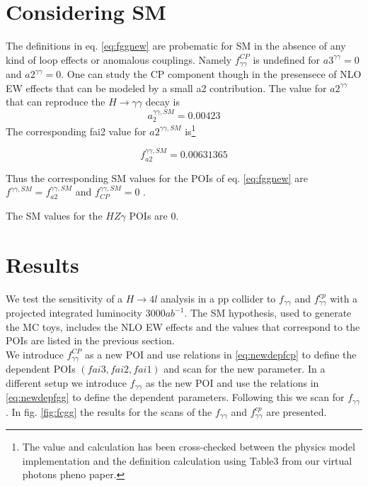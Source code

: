 \documentclass[10pt,a4paper]{article}
\begin{document}
\section{Considering SM}

The definitions in eq. \ref{eq:fggnew} are probematic for SM in the absence of any kind of loop effects or anomalous couplings. Namely $f_{\gamma\gamma}^{CP}$ is undefined for $a3^{\gamma\gamma} = 0$ and $a2^{\gamma\gamma} = 0$. One can study the CP component though in the presensece of NLO EW effects that can be modeled by a small a2 contribution. The value for $a2^{\gamma\gamma}$ that can reproduce the $H\rightarrow \gamma\gamma$ decay is
\begin{equation} 
a_{2}^{\gamma\gamma,SM} = 0.00423 
\end{equation}
The corresponding fai2 value for  $a2^{\gamma\gamma,SM}$ is\footnote{The value and calculation has been cross-checked between the physics model implementation and the definition calculation using Table3 from our virtual photons pheno paper.  } 
 
\begin{equation}
 f_{a2}^{\gamma\gamma,SM} = 0.00631365
 \end{equation}
 
 
Thus the corresponding SM values for the POIs of eq. \ref{eq:fggnew} are \\


 $f^{\gamma\gamma,SM} = f_{a2}^{\gamma\gamma,SM}$ and $f^{\gamma\gamma,SM}_{CP} = 0$  . 

The SM values for the $HZ\gamma$ POIs are 0. 







\section{Results}

We test the sensitivity of a $H\rightarrow 4l$ analysis in a pp collider to $f_{\gamma\gamma}$ and $f_{\gamma\gamma}^{cp}$ with a projected integrated luminocity 3000$ab^{-1}$. The SM hypothesis, used to generate the MC toys,  includes the NLO EW effects and the values that correspond to the POIs are listed in the previous section. 
\\
We introduce  $f_{\gamma\gamma}^{CP}$ as a new POI and use relations in \ref{eq:newdepfcp} to define the dependent POIs $(fai3,fai2,fai1)$ and scan for the new parameter. In a different setup we introduce $f_{\gamma\gamma}$ as the new POI and use the relations in \ref{eq:newdepfgg} to define the dependent parameters. Following this we scan for  $f_{\gamma\gamma}$. In fig. \ref{fig:fcgg} the results for the scans of the $f_{\gamma\gamma}$ and $f_{\gamma\gamma}^{cp}$ are presented. 
\end{document}
